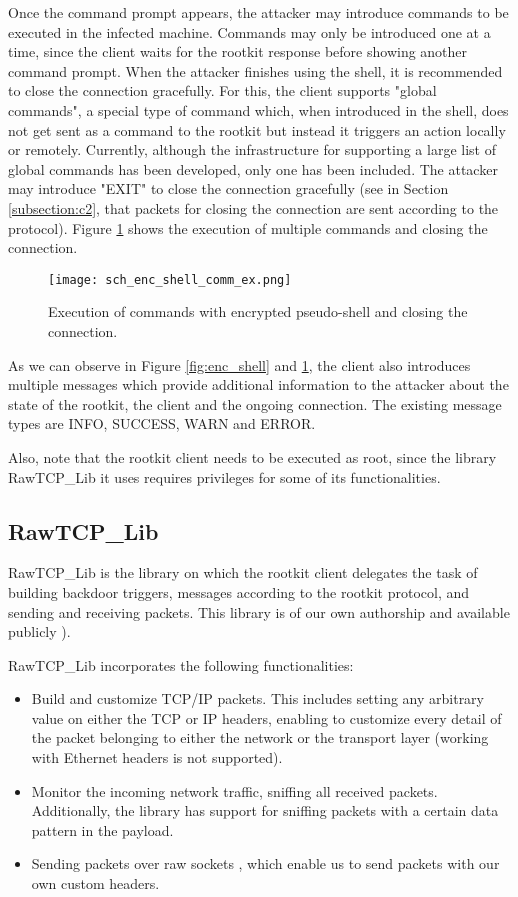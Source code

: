 Once the command prompt appears, the attacker may introduce commands to be executed in the infected machine. Commands may only be introduced one at a time, since the client waits for the rootkit response before showing another command prompt. When the attacker finishes using the shell, it is recommended to close the connection gracefully. For this, the client supports "global commands", a special type of command which, when introduced in the shell, does not get sent as a command to the rootkit but instead it triggers an action locally or remotely. Currently, although the infrastructure for supporting a large list of global commands has been developed, only one has been included. The attacker may introduce "EXIT" to close the connection gracefully (see in Section \ref{subsection:c2}, that packets for closing the connection are sent according to the protocol). Figure \ref{fig:enc_shell_comm_ex} shows the execution of multiple commands and closing the connection.

\begin{figure}[htbp]
	\centering
	\texttt{[image: sch\_enc\_shell\_comm\_ex.png]}
	\caption{Execution of commands with encrypted pseudo-shell and closing the connection.}
	\label{fig:enc_shell_comm_ex}
\end{figure}

As we can observe in Figure \ref{fig:enc_shell} and \ref{fig:enc_shell_comm_ex}, the client also introduces multiple messages which provide additional information to the attacker about the state of the rootkit, the client and the ongoing connection. The existing message types are INFO, SUCCESS, WARN and ERROR.

Also, note that the rootkit client needs to be executed as root, since the library RawTCP\_Lib it uses requires privileges for some of its functionalities. 


\subsection{RawTCP\_Lib} \label{subsection:rawtcplib}
RawTCP\_Lib is the library on which the rootkit client delegates the task of building backdoor triggers, messages according to the rootkit protocol, and sending and receiving packets. This library is of our own authorship and available publicly \cite{rawtcp_lib}).

RawTCP\_Lib incorporates the following functionalities:
\begin{itemize}
\item Build and customize TCP/IP packets. This includes setting any arbitrary value on either the TCP or IP headers, enabling to customize every detail of the packet belonging to either the network or the transport layer (working with Ethernet headers is not supported).
\item Monitor the incoming network traffic, sniffing all received packets. Additionally, the library has support for sniffing packets with a certain data pattern in the payload.
\item Sending packets over raw sockets \cite{raw_sockets}, which enable us to send packets with our own custom headers.
\end{itemize}

